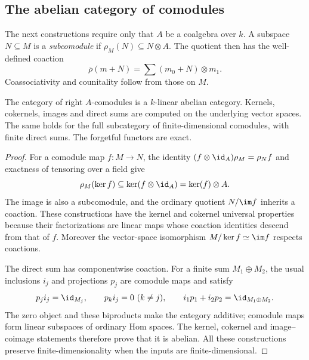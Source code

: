 \subsection{The abelian category of comodules}
The next constructions require only that $A$ be a coalgebra over $k$.
A subspace $N\subseteq M$ is a \emph{subcomodule} if
$\rho_M(N)\subseteq N\otimes A$. The quotient then has the well-defined
coaction
\[
 \overline\rho(m+N)=\sum(m_0+N)\otimes m_1.
\]
Coassociativity and counitality follow from those on $M$.

\begin{theorem}
The category of right $A$-comodules is a $k$-linear abelian category.
Kernels, cokernels, images and direct sums are computed on the underlying
vector spaces. The same holds for the full subcategory of finite-dimensional
comodules, with finite direct sums. The forgetful functors are exact.
\end{theorem}
\begin{proof}
For a comodule map $f:M\to N$, the identity
$(f\otimes\id_A)\rho_M=\rho_Nf$ and exactness of tensoring over a field
give
\[
 \rho_M(\ker f)\subseteq\ker(f\otimes\id_A)=\ker(f)\otimes A.
\]
The image is also a subcomodule, and the ordinary quotient $N/\im f$
inherits a coaction. These constructions have the kernel and cokernel
universal properties because their factorizations are linear maps whose
coaction identities descend from that of $f$. Moreover the vector-space
isomorphism $M/\ker f\simeq\im f$ respects coactions.

The direct sum has componentwise coaction. For a finite sum $M_1\oplus M_2$,
the usual inclusions $i_j$ and projections $p_j$ are comodule maps and satisfy
\[
 p_ji_j=\id_{M_j},\qquad p_ki_j=0\ (k\ne j),\qquad
 i_1p_1+i_2p_2=\id_{M_1\oplus M_2}.
\]
The zero object and these biproducts make the category additive; comodule
maps form linear subspaces of ordinary Hom spaces. The kernel, cokernel and
image--coimage statements therefore prove that it is abelian. All these
constructions preserve finite-dimensionality when the inputs are finite-dimensional.
\end{proof}

